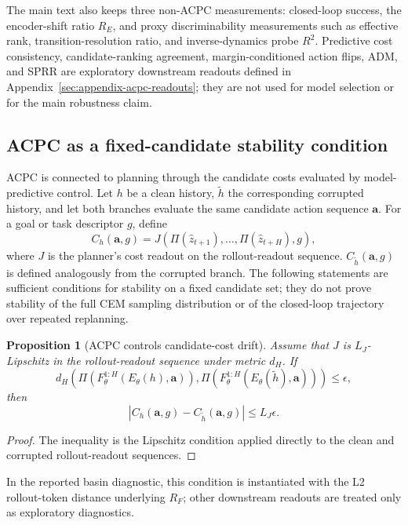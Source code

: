 \documentclass[10pt]{article}
\newtheorem{proposition}{Proposition}
\begin{document}
The main text also keeps three non-ACPC measurements: closed-loop success, the encoder-shift ratio $R_E$, and proxy discriminability measurements such as effective rank, transition-resolution ratio, and inverse-dynamics probe $R^2$. Predictive cost consistency, candidate-ranking agreement, margin-conditioned action flips, ADM, and SPRR are exploratory downstream readouts defined in Appendix~\ref{sec:appendix-acpc-readouts}; they are not used for model selection or for the main robustness claim.

\subsection{ACPC as a fixed-candidate stability condition}\label{sec:acpc-planner-stability}

ACPC is connected to planning through the candidate costs evaluated by model-predictive control. Let $h$ be a clean history, $\tilde h$ the corresponding corrupted history, and let both branches evaluate the same candidate action sequence $\mathbf a$. For a goal or task descriptor $g$, define
\begin{equation}
  C_h(\mathbf a, g)
  = J\!\left(\Pi(\hat z_{t+1}), \ldots, \Pi(\hat z_{t+H}), g\right),
  \label{eq:candidate-cost}
\end{equation}
where $J$ is the planner's cost readout on the rollout-readout sequence. $C_{\tilde h}(\mathbf a,g)$ is defined analogously from the corrupted branch. The following statements are sufficient conditions for stability on a fixed candidate set; they do not prove stability of the full CEM sampling distribution or of the closed-loop trajectory over repeated replanning.

\begin{proposition}[ACPC controls candidate-cost drift]\label{prop:cost-drift}
Assume that $J$ is $L_J$-Lipschitz in the rollout-readout sequence under metric $d_H$. If
\[
 d_H\!\left(\Pi(F_\theta^{1:H}(E_\theta(h),\mathbf a)),
             \Pi(F_\theta^{1:H}(E_\theta(\tilde h),\mathbf a))\right) \le \epsilon,
\]
then
\[
 |C_h(\mathbf a,g)-C_{\tilde h}(\mathbf a,g)| \le L_J\epsilon .
\]
\end{proposition}

\begin{proof}
The inequality is the Lipschitz condition applied directly to the clean and corrupted rollout-readout sequences.
\end{proof}

In the reported basin diagnostic, this condition is instantiated with the L2 rollout-token distance underlying $R_F$; other downstream readouts are treated only as exploratory diagnostics.
\end{document}
